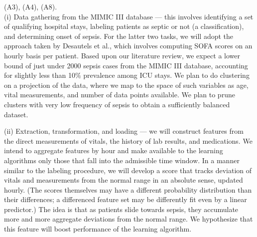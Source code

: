 \documentclass{amia}
\begin{document}
	 (A3), (A4), (A8).\\
	 (i) Data gathering from the MIMIC III database --- this involves
	identifying a set of qualifying hospital stays, labeling 
	patients as septic or not (a classification), and determining
	onset of sepsis.  For the latter two tasks, we will adopt the
        approach taken by Desautels et al.,\cite{desautels2016} which
        involves computing SOFA scores on an hourly basis per patient.
	Based upon our literature review, we expect a lower bound of
	just under 2000 sepsis cases from the MIMIC III database, 
        accounting for slightly less than 10\% prevalence among
        ICU stays.\cite{desautels2016}  
	 We plan to do clustering on a projection of the data, where
	we map to the space of such variables as age, vital measurements,
	and number of data points available.
        We plan to prune clusters with very low frequency of sepsis to 
        obtain a sufficiently balanced dataset.

	 (ii) Extraction, transformation, and loading --- we will
	construct features from the direct measurements
	of vitals, the history of lab results, and medications. We intend to aggregate
	features  by hour and make available to the learning algorithms
	only those that fall into the admissible time window.
	In a manner similar to the labeling procedure, we will develop a score
        that tracks deviation of
	vitals and measurements from the normal range in an absolute sense, updated
        hourly.
	 (The scores themselves may have a different probability distribution
	than their differences; a differenced feature set may be differently 
	fit even by a linear predictor.)
	 The idea is that as patients slide
	towards sepsis, they accumulate more and more aggregate deviations from
	the normal range.  We hypothesize that this feature will boost performance
        of the learning algorithm.
\end{document}
